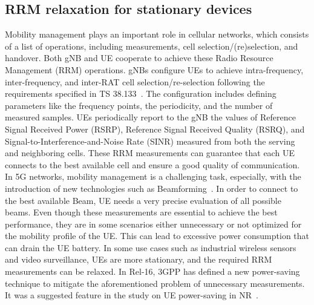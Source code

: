 \documentclass[]{IEEEtran}
\begin{document}
\subsection{RRM relaxation for stationary devices}
\label{sec:5-2}



Mobility management plays an important role in cellular networks, which consists of a list of operations, including measurements, cell selection/(re)selection, and handover. 
Both gNB and UE cooperate to achieve these Radio Resource Management (RRM) operations.
gNBs configure UEs to achieve intra-frequency, inter-frequency, and inter-RAT cell selection/re-selection following the requirements specified in TS 38.133~\cite{3gpp_nr_2022-11_38.133}. 
The configuration includes defining parameters like the frequency points, the periodicity, and the number of measured samples.
UEs periodically report to the gNB the values of Reference Signal Received Power (RSRP), Reference Signal Received Quality (RSRQ), and Signal-to-Interference-and-Noise Rate (SINR) measured from both the serving and neighboring cells.
These RRM measurements can guarantee that each UE connects to the best available cell and ensure a good quality of communication.
In 5G networks, mobility management is a challenging task, especially, with the introduction of new technologies such as Beamforming~\cite{kumar2021analytical}. 
In order to connect to the best available Beam, UE needs a very precise evaluation of all possible beams. 
Even though these measurements are essential to achieve the best performance, they are in some scenarios either unnecessary or not optimized for the mobility profile of the UE. 
This can lead to excessive power consumption that can drain the UE battery. 
In some use cases such as industrial wireless sensors and video surveillance, UEs are more stationary, and the required RRM measurements can be relaxed.
In Rel-16, 3GPP has defined a new power-saving technique to mitigate the aforementioned problem of unnecessary measurements. It was a suggested feature in the study on UE power-saving in NR~\cite{3gpp_study_2019_38.840}.
\end{document}

